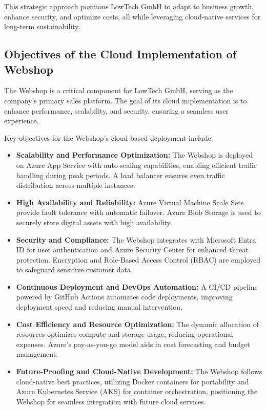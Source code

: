 \documentclass{llncs}
\begin{document}
This strategic approach positions LowTech GmbH to adapt to business growth, enhance security, and optimize costs, all while leveraging cloud-native services for long-term sustainability.


\subsection{Objectives of the Cloud Implementation of Webshop}

The Webshop is a critical component for LowTech GmbH, serving as the company’s primary sales platform. The goal of its cloud implementation is to enhance performance, scalability, and security, ensuring a seamless user experience.

Key objectives for the Webshop's cloud-based deployment include:

\begin{itemize}
    \item \textbf{Scalability and Performance Optimization:}  
    The Webshop is deployed on Azure App Service with auto-scaling capabilities, enabling efficient traffic handling during peak periods. A load balancer ensures even traffic distribution across multiple instances.
    \bigskip %
    \item \textbf{High Availability and Reliability:}  
    Azure Virtual Machine Scale Sets provide fault tolerance with automatic failover. Azure Blob Storage is used to securely store digital assets with high availability.
    \bigskip %
    \item \textbf{Security and Compliance:}  
    The Webshop integrates with Microsoft Entra ID for user authentication and Azure Security Center for enhanced threat protection. Encryption and Role-Based Access Control (RBAC) are employed to safeguard sensitive customer data.
    \bigskip %
    \item \textbf{Continuous Deployment and DevOps Automation:}  
    A CI/CD pipeline powered by GitHub Actions automates code deployments, improving deployment speed and reducing manual intervention.
    \bigskip %
    \item \textbf{Cost Efficiency and Resource Optimization:}  
    The dynamic allocation of resources optimizes compute and storage usage, reducing operational expenses. Azure’s pay-as-you-go model aids in cost forecasting and budget management.
    \bigskip %
    \item \textbf{Future-Proofing and Cloud-Native Development:}  
    The Webshop follows cloud-native best practices, utilizing Docker containers for portability and Azure Kubernetes Service (AKS) for container orchestration, positioning the Webshop for seamless integration with future cloud services.
\end{itemize}
\end{document}
